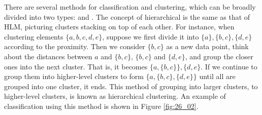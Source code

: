 \documentclass{ltjsbook}
\begin{document}
There are several methods for classification and clustering, which can be broadly divided into two types:  and . The concept of hierarchical is the same as that of HLM, picturing clusters stacking on top of each other. For instance, when clustering elements $\{a,b,c,d,e\}$, suppose we first divide it into $\{a\},\{b,c\},\{d,e\}$ according to the proximity. Then we consider $\{b,c\}$ as a new data point, think about the distances between $a$ and $\{b,c\}$, $\{b,c\}$ and $\{d,e\}$, and group the closer ones into the next cluster. That is, it becomes $\{a,\{b,c\}\},\{d,e\}$. If we continue to group them into higher-level clusters to form $\{a,\{b,c\},\{d,e\}\}$ until all are grouped into one cluster, it ends. This method of grouping into larger clusters, to higher-level clusters, is known as hierarchical clustering. An example of classification using this method is shown in Figure \ref{fig:26_02}.

\end{document}

